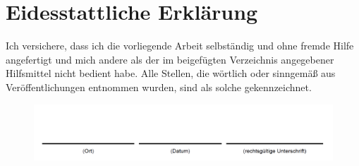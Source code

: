\chapter*{Eidesstattliche Erklärung}

Ich versichere, dass ich die vorliegende Arbeit selbständig und ohne fremde Hilfe angefertigt und mich andere als der im beigefügten Verzeichnis angegebener Hilfsmittel nicht bedient habe. Alle Stellen, die wörtlich oder sinngemäß aus Veröffentlichungen entnommen wurden, sind als solche gekennzeichnet.

\vspace{1cm} %

\begin{figure}[h]
	\centering
	\includegraphics[width=\textwidth]{2023_11_29_Bilder_Dokumentation/Eidesstattliche_Erklaerung.png}
\end{figure}

\clearpage